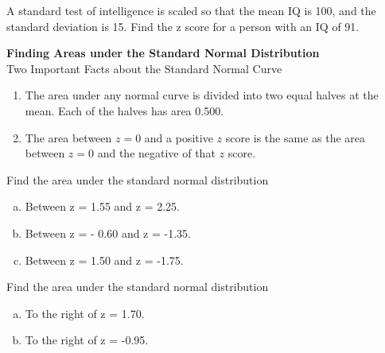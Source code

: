 \documentclass[english,lecture,12pt]{gWmaths}
\begin{document}
\begin{Exercise}
A standard test of intelligence is scaled so that the mean IQ is 100, and the standard deviation is 15. Find the z score for a person with an IQ of 91.
\vspace{10 in}
\end{Exercise}


\noindent
\textbf{Finding Areas under the Standard Normal Distribution}\\

\noindent
Two Important Facts about the Standard Normal Curve

\begin{enumerate}[1.]
\item The area under any normal curve is divided into two equal halves at the mean. Each of the halves has area 0.500.
\item The area between $z = 0$ and a positive $z$ score is the same as the area between $z = 0$ and the negative of that $z$ score.
\end{enumerate}


\begin{Exercise}
Find the area under the standard normal distribution 
\begin{enumerate}[a.]
\item Between z = 1.55 and z = 2.25.
\vspace{10 in}


\item Between z = - 0.60 and z = -1.35.
\vspace{10 in}


\item Between z = 1.50 and z = -1.75.
\vspace{10 in}


\end{enumerate}
\end{Exercise}



\begin{Exercise}
Find the area under the standard normal distribution 
\begin{enumerate}[a.]
\item To the right of z = 1.70.
\vspace{10 in}

\item To the right of z = -0.95.
\vspace{3 in}
\end{enumerate}
\end{Exercise}
\end{document}
